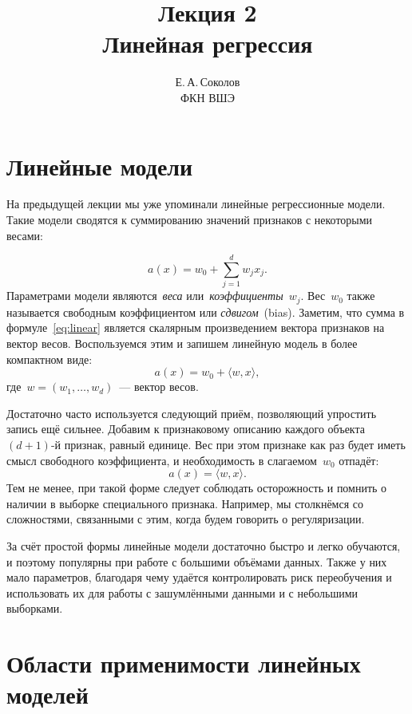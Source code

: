 \documentclass[12pt,fleqn]{article}
\begin{document}
\title{Лекция 2\\Линейная регрессия}
\author{Е.\,А.\,Соколов\\ФКН ВШЭ}
\maketitle

\section{Линейные модели}

На предыдущей лекции мы уже упоминали линейные регрессионные модели.
Такие модели сводятся к суммированию значений признаков с некоторыми весами:

\begin{equation}
\label{eq:linear}
    a(x)
    =
    w_0
    +
    \sum_{j = 1}^{d}
        w_j x_j.
\end{equation}
Параметрами модели являются~\emph{веса} или~\emph{коэффициенты}~$w_j$.
Вес~$w_0$ также называется свободным коэффициентом или \emph{сдвигом}~(bias).
Заметим, что сумма в формуле~\eqref{eq:linear} является скалярным произведением
вектора признаков на вектор весов.
Воспользуемся этим и запишем линейную модель в более компактном виде:
\begin{equation}
\label{eq:linearCompact}
    a(x)
    =
    w_0
    +
    \langle w, x \rangle,
\end{equation}
где~$w = (w_1, \dots, w_d)$~--- вектор весов.

Достаточно часто используется следующий приём, позволяющий упростить запись ещё сильнее.
Добавим к признаковому описанию каждого объекта $(d + 1)$-й признак, равный единице.
Вес при этом признаке как раз будет иметь смысл свободного коэффициента,
и необходимость в слагаемом~$w_0$ отпадёт:
\[
    a(x)
    =
    \langle w, x \rangle.
\]
Тем не менее, при такой форме следует соблюдать осторожность и помнить
о наличии в выборке специального признака.
Например, мы столкнёмся со сложностями, связанными с этим, когда будем говорить о регуляризации.

За счёт простой формы линейные модели достаточно быстро и легко обучаются,
и поэтому популярны при работе с большими объёмами данных.
Также у них мало параметров, благодаря чему удаётся контролировать риск переобучения
и использовать их для работы с зашумлёнными данными и с небольшими выборками.

\section{Области применимости линейных моделей}
\end{document}
